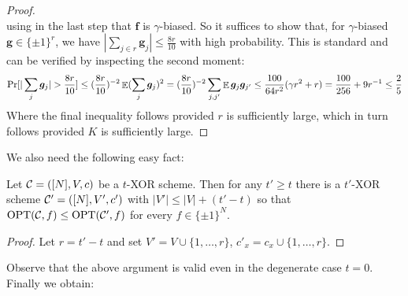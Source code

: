 \begin{proof}
\[\]
using in the last step that $\bm{f}$ is $\gamma$-biased. So it suffices to show that, for $\gamma$-biased $\bm{g} \in \{\pm 1\}^r$, we have $|\sum_{j \in r} \bm{g}_j| \leq \frac{8r}{10}$ with high probability. This is standard and can be verified by inspecting the second moment:
\begin{gather*}
\Pr[|\sum_j \bm{g}_j| > \frac{8r}{10}] \leq  (\frac{8r}{10})^{-2}\mathop{\mathbb{E}} (\sum_j \bm{g}_j)^2 =  (\frac{8r}{10})^{-2}\sum_{j,j'}\mathop{\mathbb{E}} \bm{g}_j \bm{g}_{j'} 
\leq \frac{100}{64r^2}(\gamma r^2  + r) = \frac{100}{256} + 9r^{-1} \leq \frac{2}{5}
\end{gather*}
Where the final inequality follows provided $r$ is sufficiently large, which in turn follows provided $K$ is sufficiently large.
\end{proof}
We also need the following easy fact:
\begin{observation}\label{cellprobe:obs:csp-padding}
Let $\mathcal{C} = ([N],V,c)$ be a $t$-XOR scheme. Then for any $t' \geq t$ there is a $t'$-XOR scheme $\mathcal{C'}=([N],V',c')$ with $|V'| \leq |V|+ (t'-t)$ so that $\mathrm{OPT}(\mathcal{C},f) \leq \mathrm{OPT}(\mathcal{C'},f)$ for every $f \in \{\pm 1\}^N$.
\end{observation}
\begin{proof}
Let $r = t'-t$ and set $V' = V \cup \{1,\ldots,r\}$, $c'_x = c_x \cup \{1,\ldots,r\}$.
\end{proof}
Observe that the above argument is valid even in the degenerate case $t = 0$. Finally we obtain:

